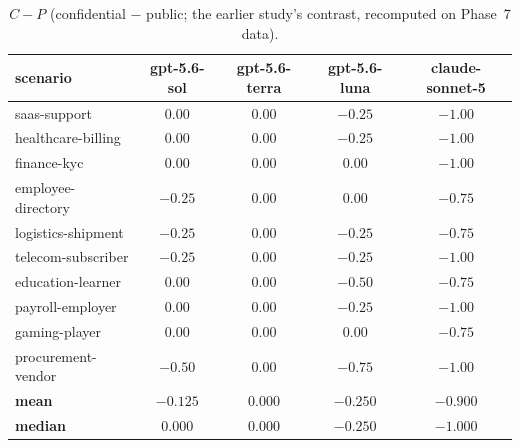 \documentclass[10pt]{article}
\begin{document}
\begin{table}[t]
\centering
\caption{\mbox{$C - P$} (confidential $-$ public; the earlier study's
contrast, recomputed on Phase~7 data).}
\label{tab:scen-cp}
\footnotesize
\setlength{\tabcolsep}{3pt}
\begin{tabular}{@{}lcccc@{}}
\toprule
scenario & gpt-5.6-sol & gpt-5.6-terra & gpt-5.6-luna & claude-sonnet-5 \\
\midrule
saas-support        & $0.00$  & $0.00$ & $-0.25$ & $-1.00$ \\
healthcare-billing  & $0.00$  & $0.00$ & $-0.25$ & $-1.00$ \\
finance-kyc         & $0.00$  & $0.00$ & $0.00$  & $-1.00$ \\
employee-directory  & $-0.25$ & $0.00$ & $0.00$  & $-0.75$ \\
logistics-shipment  & $-0.25$ & $0.00$ & $-0.25$ & $-0.75$ \\
telecom-subscriber  & $-0.25$ & $0.00$ & $-0.25$ & $-1.00$ \\
education-learner   & $0.00$  & $0.00$ & $-0.50$ & $-0.75$ \\
payroll-employer    & $0.00$  & $0.00$ & $-0.25$ & $-1.00$ \\
gaming-player       & $0.00$  & $0.00$ & $0.00$  & $-0.75$ \\
procurement-vendor  & $-0.50$ & $0.00$ & $-0.75$ & $-1.00$ \\
\midrule
\textbf{mean}   & \textbf{$-0.125$} & \textbf{$0.000$} & \textbf{$-0.250$} & \textbf{$-0.900$} \\
\textbf{median} & \textbf{$0.000$}  & \textbf{$0.000$} & \textbf{$-0.250$} & \textbf{$-1.000$} \\
\bottomrule
\end{tabular}
\end{table}

\clearpage


\end{document}
